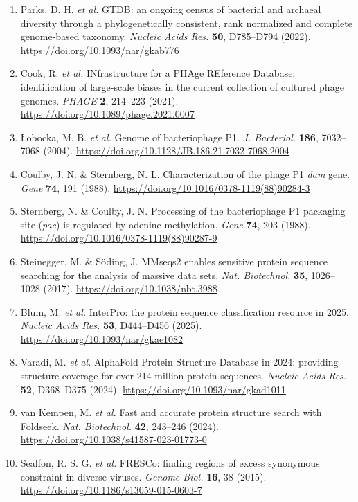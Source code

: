 \documentclass[10pt,letterpaper]{article}
\newcommand{\gene}[1]{\textit{#1}}
\begin{document}
{\begin{enumerate}[leftmargin=1.9em,itemsep=-0.6pt,parsep=0pt,topsep=0.5pt]
  \item Parks, D. H. \textit{et al.} GTDB: an ongoing census of bacterial and archaeal diversity through a phylogenetically consistent, rank normalized and complete genome-based taxonomy. \textit{Nucleic Acids Res.} \textbf{50}, D785--D794 (2022). \url{https://doi.org/10.1093/nar/gkab776}
  \item Cook, R. \textit{et al.} INfrastructure for a PHAge REference Database: identification of large-scale biases in the current collection of cultured phage genomes. \textit{PHAGE} \textbf{2}, 214--223 (2021). \url{https://doi.org/10.1089/phage.2021.0007}
  \item \L{}obocka, M. B. \textit{et al.} Genome of bacteriophage P1. \textit{J. Bacteriol.} \textbf{186}, 7032--7068 (2004). \url{https://doi.org/10.1128/JB.186.21.7032-7068.2004}
  \item Coulby, J. N. \& Sternberg, N. L. Characterization of the phage P1 \gene{dam} gene. \textit{Gene} \textbf{74}, 191 (1988). \url{https://doi.org/10.1016/0378-1119(88)90284-3}
  \item Sternberg, N. \& Coulby, J. N. Processing of the bacteriophage P1 packaging site (\gene{pac}) is regulated by adenine methylation. \textit{Gene} \textbf{74}, 203 (1988). \url{https://doi.org/10.1016/0378-1119(88)90287-9}
  \item Steinegger, M. \& S\"oding, J. MMseqs2 enables sensitive protein sequence searching for the analysis of massive data sets. \textit{Nat. Biotechnol.} \textbf{35}, 1026--1028 (2017). \url{https://doi.org/10.1038/nbt.3988}
  \item Blum, M. \textit{et al.} InterPro: the protein sequence classification resource in 2025. \textit{Nucleic Acids Res.} \textbf{53}, D444--D456 (2025). \url{https://doi.org/10.1093/nar/gkae1082}
  \item Varadi, M. \textit{et al.} AlphaFold Protein Structure Database in 2024: providing structure coverage for over 214 million protein sequences. \textit{Nucleic Acids Res.} \textbf{52}, D368--D375 (2024). \url{https://doi.org/10.1093/nar/gkad1011}
  \item van Kempen, M. \textit{et al.} Fast and accurate protein structure search with Foldseek. \textit{Nat. Biotechnol.} \textbf{42}, 243--246 (2024). \url{https://doi.org/10.1038/s41587-023-01773-0}
  \item Sealfon, R. S. G. \textit{et al.} FRESCo: finding regions of excess synonymous constraint in diverse viruses. \textit{Genome Biol.} \textbf{16}, 38 (2015). \url{https://doi.org/10.1186/s13059-015-0603-7}

\end{enumerate}}
\end{document}
